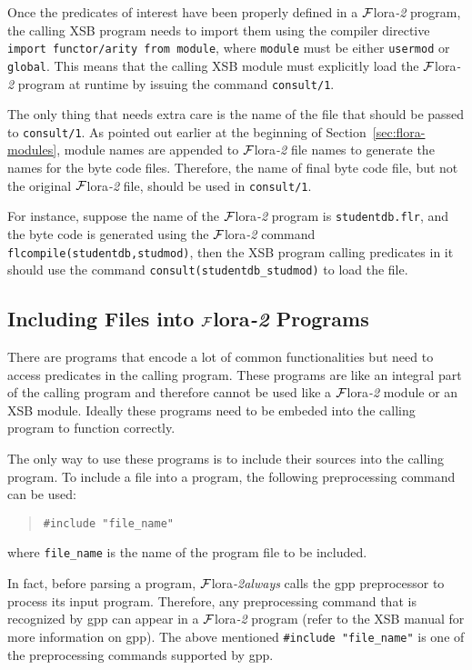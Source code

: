 \documentclass[11pt]{article}
\newcommand{\FLORA}{{\mbox{${\cal F}${\sc lora}\rm\emph{-2}}}\xspace}
\begin{document}
Once the predicates of interest have been properly defined in a \FLORA
program, the calling XSB program needs to import them using the
compiler directive \mbox{\tt import functor/arity from module}, where
{\tt module} must be either {\tt usermod} or {\tt global}. This means
that the calling XSB module must explicitly load the \FLORA program 
at runtime by issuing the command {\tt consult/1}.

%
The only thing that needs extra care is the name of the file that
should be passed to \mbox{\tt consult/1}. As pointed out earlier at
the beginning of Section~\ref{sec:flora-modules}, module names are
appended to \FLORA file names to generate the names for the byte code
files. Therefore, the name of final byte code file, but not the
original \FLORA file, should be used in {\tt consult/1}.

For instance, suppose the name of the \FLORA program is
{\tt studentdb.flr}, and the byte code is generated using the \FLORA
command {\tt flcompile(studentdb,studmod)}, then the XSB program
calling predicates in it should use the command
\verb|consult(studentdb_studmod)| to load the file.


\subsection{Including Files into \FLORA Programs}


There are programs that encode a lot of common functionalities but
need to access predicates in the calling program. These programs are
like an integral part of the calling program and therefore cannot be
used like a \FLORA module or an XSB module. Ideally these programs
need to be embeded into the calling program to function correctly.

%
The only way to use these programs is to include their sources into
the calling program. To include a file into a program, the following
preprocessing command can be used:
\begin{quote}
\verb|#include "file_name"|
\end{quote}
where \verb|file_name| is the name of the program file to be included.

In fact, before parsing a program, \FLORA \emph{always} calls the
{\sf gpp} preprocessor to process its input program. Therefore, any
preprocessing command that is recognized by {\sf gpp} can appear in
a \FLORA program (refer to the XSB manual for more information on
{\sf gpp}). The above mentioned \verb|#include "file_name"| is one
of the preprocessing commands supported by {\sf gpp}.
\end{document}
